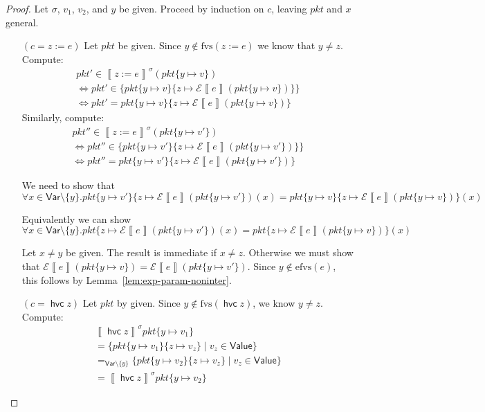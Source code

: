 \documentclass{article}
\newcommand{\pkt}{\mathit{pkt}}
\newcommand{\denote}[1]{\left\llbracket#1\right\rrbracket}
\newcommand{\edenote}[1]{\mathcal{E}\denote{#1}}
\newcommand{\Value}{\mathsf{Value}}
\newcommand{\Var}{\mathsf{Var}}
\newcommand{\havoc}[1]{\mathop{\mathsf{hvc}}#1}
\newcommand{\fvs}{\textrm{fvs}}
\newcommand{\efvs}{\textrm{efvs}}
\theoremstyle{plain}
\theoremstyle{definition}
\theoremstyle{remark}
\begin{document}
\begin{proof}
  Let $\sigma$, $v_1$, $v_2$, and $y$ be given.
  Proceed by induction on $c$, leaving $\pkt$ and $x$ general.
  \begin{enumerate}[align=left]
  \item[$(c = z := e)$]
    Let $\pkt$ be given. Since $y \not\in \fvs(z := e)$ we know that $y \neq z$.
    Compute:
    \[\begin{array}{ll}
    \pkt' \in \denote{z:=e}^\sigma (\pkt\{y \mapsto v\}) \\
    \iff \pkt' \in \{\pkt\{y \mapsto v\}\{z \mapsto \edenote{e}(\pkt\{y\mapsto v\})\}\}\\
    \iff \pkt' = \pkt\{y \mapsto v\}\{z \mapsto \edenote{e}(\pkt\{y\mapsto v\})\}
    \end{array}
    \]
    Similarly, compute:
    \[\begin{array}{ll}
    \pkt'' \in \denote{z:=e}^\sigma (\pkt\{y \mapsto v'\})\\
    \iff \pkt'' \in \{\pkt\{y \mapsto v'\}\{z \mapsto \edenote{e}(\pkt\{y\mapsto v'\})\}\}\\
    \iff \pkt'' = \pkt\{y \mapsto v'\}\{z \mapsto \edenote{e}(\pkt\{y\mapsto v'\})\}
    \end{array}
    \]

    We need to show that
    \[\forall x \in \Var \setminus \{y\}.
    \pkt\{y \mapsto v'\}\{z \mapsto \edenote{e}(\pkt\{y\mapsto v'\})(x)
    = \pkt\{y \mapsto v\}\{z \mapsto \edenote{e}(\pkt\{y\mapsto v\})\}(x)
    \]

    Equivalently we can show
    \[\forall x \in \Var \setminus \{y\}.
    \pkt\{z \mapsto \edenote{e}(\pkt\{y\mapsto v'\})(x)
    = \pkt\{z \mapsto \edenote{e}(\pkt\{y\mapsto v\})\}(x)
    \]

    Let $x \neq y$ be given. The result is immediate if $x \neq z$. Otherwise we
    must show that $\edenote{e}(\pkt\{y \mapsto v\}) = \edenote{e}(\pkt\{y
    \mapsto v'\})$. Since $y \not \in \efvs(e)$, this follows by
    Lemma~\ref{lem:exp-param-noninter}.


  \item[$(c = \havoc z)$] Let $\pkt$ by given. Since $y \not \in \fvs(\havoc z)$, we know $y \neq z$.
    Compute:
    \[\begin{array}{ll}
    \denote{\havoc z}^\sigma\pkt\{y \mapsto v_1\} \\
    = \{\pkt\{y \mapsto v_1\}\{z \mapsto v_z\} \mid v_z \in \Value\}\\
    =_{\Var \setminus \{y\}} \{\pkt\{y \mapsto v_2\}\{z \mapsto v_z\} \mid v_z \in \Value\} \\
    = \denote{\havoc z}^\sigma\pkt\{y \mapsto v_2\}
    \end{array}
    \]


\end{enumerate}
\end{proof}
\end{document}
